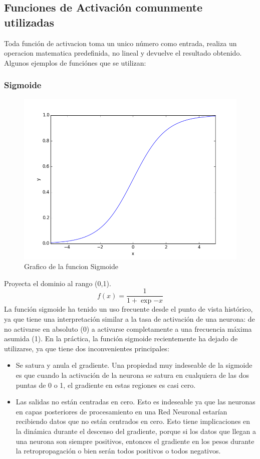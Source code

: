 \documentclass[a4paper,11pt,spanish]{book}
\begin{document}
      \subsection {Funciones de Activación comunmente utilizadas}
	Toda función de activacion toma un unico número como entrada, realiza un operacion matematica predefinida, no lineal y devuelve el resultado obtenido.
	Algunos ejemplos de funciónes que se utilizan:
	  \subsubsection {Sigmoide}
	    \begin{figure}[H]
	      \includegraphics[scale=0.5]{./img/sigmoid.png}
	      \caption{Grafico de la funcion Sigmoide}
	      \label{fig:sigmoid}
	    \end{figure}
	    Proyecta el dominio al rango (0,1).
	    \begin{equation}
	     f(x) = \frac{1}{1+\exp{-x}}
	    \end{equation}
	    La función sigmoide ha tenido un uso frecuente desde el punto de vista histórico, ya que tiene una interpretación similar a la tasa de activación de una neurona:
	    de no activarse en absoluto (0) a activarse completamente a una frecuencia máxima asumida (1). En la práctica, la función sigmoide recientemente ha dejado de utilizarse,
	    ya  que tiene dos inconvenientes principales:
	    \begin{itemize}
	     \item Se satura y anula el gradiente. Una propiedad muy indeseable de la sigmoide es que cuando la activación de la neurona se satura en cualquiera de las dos puntas de 0 o 1,
	      el gradiente en estas regiones es casi cero.
	     \item Las salidas no están centradas en cero. Esto es indeseable ya que las neuronas en capas posteriores de procesamiento en una Red Neuronal estarían recibiendo
	      datos que no están centrados en cero. Esto tiene implicaciones en la dinámica durante el descenso del gradiente, porque si los datos que llegan a una neurona
	      son siempre positivos, entonces el gradiente en los pesos durante la retropropagación o bien serán todos positivos o todos negativos.
	    \end{itemize}
\end{document}
